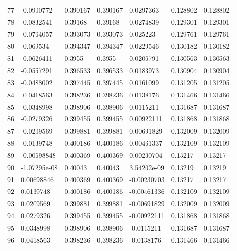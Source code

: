 \begin{longtable}{l|lll|lll}
  77 & -0.0900772   & 0.390167    & 0.390167    &  0.0297363   & 0.128802    & 0.128802    \\
  78 & -0.0832541   & 0.39168     & 0.39168     &  0.0274839   & 0.129301    & 0.129301    \\
  79 & -0.0764057   & 0.393073    & 0.393073    &  0.025223    & 0.129761    & 0.129761    \\
  80 & -0.069534    & 0.394347    & 0.394347    &  0.0229546   & 0.130182    & 0.130182    \\
  81 & -0.0626411   & 0.3955      & 0.3955      &  0.0206791   & 0.130563    & 0.130563    \\
  82 & -0.0557291   & 0.396533    & 0.396533    &  0.0183973   & 0.130904    & 0.130904    \\
  83 & -0.0488002   & 0.397445    & 0.397445    &  0.0161099   & 0.131205    & 0.131205    \\
  84 & -0.0418563   & 0.398236    & 0.398236    &  0.0138176   & 0.131466    & 0.131466    \\
  85 & -0.0348998   & 0.398906    & 0.398906    &  0.0115211   & 0.131687    & 0.131687    \\
  86 & -0.0279326   & 0.399455    & 0.399455    &  0.00922111  & 0.131868    & 0.131868    \\
  87 & -0.0209569   & 0.399881    & 0.399881    &  0.00691829  & 0.132009    & 0.132009    \\
  88 & -0.0139748   & 0.400186    & 0.400186    &  0.00461337  & 0.132109    & 0.132109    \\
  89 & -0.00698848  & 0.400369    & 0.400369    &  0.00230704  & 0.13217     & 0.13217     \\
  90 & -1.07295e-08 & 0.40043     & 0.40043     &  3.54202e-09 & 0.13219     & 0.13219     \\
  91 &  0.00698846  & 0.400369    & 0.400369    & -0.00230703  & 0.13217     & 0.13217     \\
  92 &  0.0139748   & 0.400186    & 0.400186    & -0.00461336  & 0.132109    & 0.132109    \\
  93 &  0.0209569   & 0.399881    & 0.399881    & -0.00691829  & 0.132009    & 0.132009    \\
  94 &  0.0279326   & 0.399455    & 0.399455    & -0.00922111  & 0.131868    & 0.131868    \\
  95 &  0.0348998   & 0.398906    & 0.398906    & -0.0115211   & 0.131687    & 0.131687    \\
  96 &  0.0418563   & 0.398236    & 0.398236    & -0.0138176   & 0.131466    & 0.131466    \\

\end{longtable}

